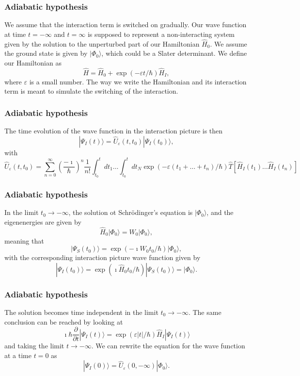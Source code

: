 \frame
{
\frametitle{Adiabatic hypothesis}
\begin{small}
{\scriptsize
We assume that the interaction term is switched on gradually. Our wave function at time $t=-\infty$ and $t=\infty$ is supposed to represent a non-interacting system
given by the solution to the unperturbed part of our Hamiltonian $\hat{H}_0$.
We assume the ground state is given by $|\Phi_0\rangle$, which could be a Slater determinant.
We define our Hamiltonian as
\[
\hat{H}=\hat{H}_0+\exp{(-\varepsilon t/\hbar)}\hat{H}_I,
\]
where $\varepsilon$ is a small number. The way we write the Hamiltonian 
and its interaction term is meant to simulate the switching of the interaction.
}
\end{small}
}
\frame
{
\frametitle{Adiabatic hypothesis}
\begin{small}
{\scriptsize
The time evolution of the wave function in the interaction picture is then
\[
|\Psi_I(t) \rangle = \hat{U}_{\varepsilon}(t,t_0)|\Psi_I(t_0)\rangle,
\]
with 
\[
\hat{U}_{\varepsilon}(t,t_0)=\sum_{n=0}^{\infty}\left(\frac{-\imath}{\hbar}\right)^n\frac{1}{n!}
\int_{t_0}^t dt_1\dots \int_{t_0}^t dt_N \exp{(-\varepsilon(t_1+\dots+t_n)/\hbar)}\hat{T}\left[\hat{H}_I(t_1)\dots\hat{H}_I(t_n)\right]
\]
}
\end{small}
}
\frame
{
\frametitle{Adiabatic hypothesis}
\begin{small}
{\scriptsize
In the limit $t_0\rightarrow -\infty$, the solution ot Schr\"odinger's equation is
$|\Phi_0\rangle$, and the eigenenergies are given by 
\[
\hat{H}_0|\Phi_0\rangle=W_0|\Phi_0\rangle,
\]
meaning that 
\[
|\Psi_S(t_0)\rangle = \exp{(-\imath W_0t_0/\hbar)}|\Phi_0\rangle,
\]
with the corresponding interaction picture wave function given by
\[
|\Psi_I(t_0)\rangle = \exp{(\imath \hat{H}_0t_0/\hbar)}|\Psi_S(t_0)\rangle=|\Phi_0\rangle.
\]
}
\end{small}
}
\frame
{
\frametitle{Adiabatic hypothesis}
\begin{small}
{\scriptsize
The solution becomes time independent in the limit $t_0\rightarrow -\infty$.
The same conclusion can be reached by looking at 
\[
\imath \hbar\frac{\partial }{\partial t}|\Psi_I(t)\rangle =
\exp{(\varepsilon |t|/\hbar)}\hat{H}_I|\Psi_I(t)\rangle 
\]
and taking the limit $t\rightarrow -\infty$.
We can rewrite the equation for the wave function at a time $t=0$ as
\[
|\Psi_I(0) \rangle = \hat{U}_{\varepsilon}(0,-\infty)|\Phi_0\rangle.
\]
}
\end{small}
}
